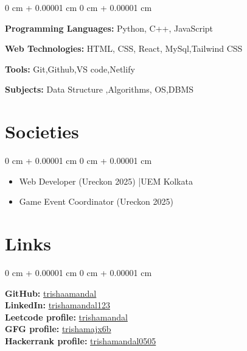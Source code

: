 \documentclass[12pt, a3paper]{article}
\newenvironment{highlightsforbulletentries}{
    \begin{itemize}[
        topsep=0.10 cm,
        parsep=0.10 cm,
        partopsep=0pt,
        itemsep=0pt,
        leftmargin=10pt
    ]
}{
    \end{itemize}
} %
\newenvironment{onecolentry}{
    \begin{adjustwidth}{
        0 cm + 0.00001 cm
    }{
        0 cm + 0.00001 cm
    }
}{
    \end{adjustwidth}
} %
\begin{document}
        
        \begin{onecolentry}
            \item \textbf{Programming Languages:} Python, C++, JavaScript
            \item \textbf{Web Technologies:} HTML, CSS, React, MySql,Tailwind CSS
            \item \textbf{Tools:} Git,Github,VS code,Netlify
            \item \textbf{Subjects:} Data Structure ,Algorithms, OS,DBMS
        \end{onecolentry}

        \vspace{0.7 cm}
        \section{Societies}

        \begin{onecolentry}
            \begin{highlightsforbulletentries}
    
    
            \item Web Developer (Ureckon 2025) |UEM Kolkata
            \item Game Event Coordinator (Ureckon 2025)    
    
            \end{highlightsforbulletentries}
        \end{onecolentry}
        \vspace{0.7 cm}
        \section{Links}

        \begin{onecolentry}
            \begin{highlightsforbulletentries}
    
    
                \textbf{GitHub:} \href{https://github.com/trishaamandal}{trishaamandal} \\
                \textbf{LinkedIn:} \href{https://www.linkedin.com/in/trishamandal123/}{trishamandal123} \\                   
                \textbf{Leetcode profile:} \href{https://leetcode.com/u/trishumandal/}{trishamandal} \\
                \textbf{GFG profile:} \href{https://www.geeksforgeeks.org/user/trishamajx6b/}{trishamajx6b} \\
                \textbf{Hackerrank profile:} \href{https://www.hackerrank.com/profile/trishamandal0505}{trishamandal0505}
            \end{highlightsforbulletentries}
        \end{onecolentry}
        \vspace{0.7 cm}
\end{document}
